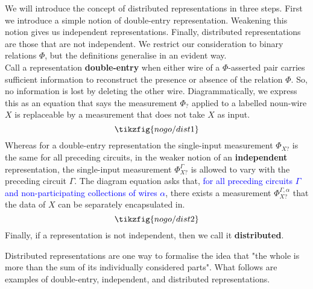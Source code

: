\begin{defn}
We will introduce the concept of distributed representations in three steps. First we introduce a simple notion of double-entry representation. Weakening this notion gives us independent representations. Finally, distributed representations are those that are not independent. We restrict our consideration to binary relations $\Phi$, but the definitions generalise in an evident way.\\
Call a representation \textbf{double-entry} when either wire of a $\Phi$-asserted pair carries sufficient information to reconstruct the presence or absence of the relation $\Phi$. So, no information is lost by deleting the other wire. Diagrammatically, we express this as an equation that says the measurement $\Phi_{?}$ applied to a labelled noun-wire $X$ is replaceable by a measurement that does not take $X$ as input.
\[\tikzfig{nogo/dist1}\]
Whereas for a double-entry representation the single-input measurement $\Phi_{X?}$ is the same for all preceding circuits, in the weaker notion of an \textbf{independent} representation, the single-input measurement $\Phi^\Gamma_{X?}$ is allowed to vary with the preceding circuit $\Gamma$. The diagram equation asks that, \textcolor{blue}{for all preceding circuits $\Gamma$ and non-participating collections of wires $\alpha$}, there exists a measurement $\Phi^{\Gamma,\alpha}_{X?}$ that the data of $X$ can be separately encapsulated in.
\[\tikzfig{nogo/dist2}\]
Finally, if a representation is not independent, then we call it \textbf{distributed}.
\end{defn}

Distributed representations are one way to formalise the idea that "the whole is more than the sum of its individually considered parts". What follows are examples of double-entry, independent, and distributed representations.

